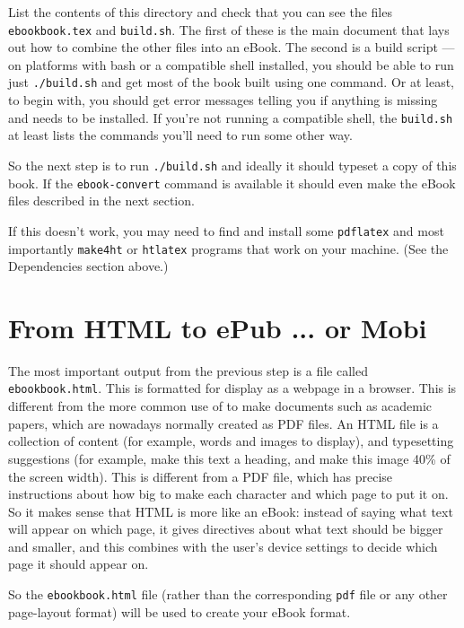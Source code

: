 List the contents of this directory and check that you can see the
files \texttt{ebookbook.tex} and \texttt{build.sh}. The first of these
is the main \tex document that lays out how to combine the other files
into an eBook.  The second is a build script --- on platforms with
bash or a compatible shell installed, you should be able to run just
\texttt{./build.sh} and get most of the book built using one
command. Or at least, to begin with, you should get error messages
telling you if anything is missing and needs to be installed. If you're not
running a compatible shell, the \texttt{build.sh} at least lists
the commands you'll need to run some other way.

So the next step is to run \texttt{./build.sh} and ideally it should
typeset a copy of this book. If the \texttt{ebook-convert} command is
available it should even make the eBook files described in the next
section.

If this doesn't work, you may need to find and install some
\texttt{pdflatex} and most importantly \texttt{make4ht} or
\texttt{htlatex} programs that work on your machine. (See the
Dependencies section above.)

\section{From HTML to ePub ... or Mobi}
\label{sec:html2epub}

The most important output from the previous step is a file called
\texttt{ebookbook.html}.  This is formatted for display as a webpage
in a browser. This is different from the more common use of \tex to
make documents such as academic papers, which are nowadays normally
created as PDF files. An HTML file is a collection of content (for
example, words and images to display), and typesetting suggestions
(for example, make this text a heading, and make this image 40\% of
the screen width). This is different from a PDF file, which has
precise instructions about how big to make each character and which
page to put it on. So it makes sense that HTML is more like an eBook:
instead of saying what text will appear on which page, it gives
directives about what text should be bigger and smaller, and this
combines with the user's device settings to decide which page it
should appear on.

So the \texttt{ebookbook.html} file (rather than the corresponding
\texttt{pdf} file or any other page-layout format) will be used to
create your eBook format. 

